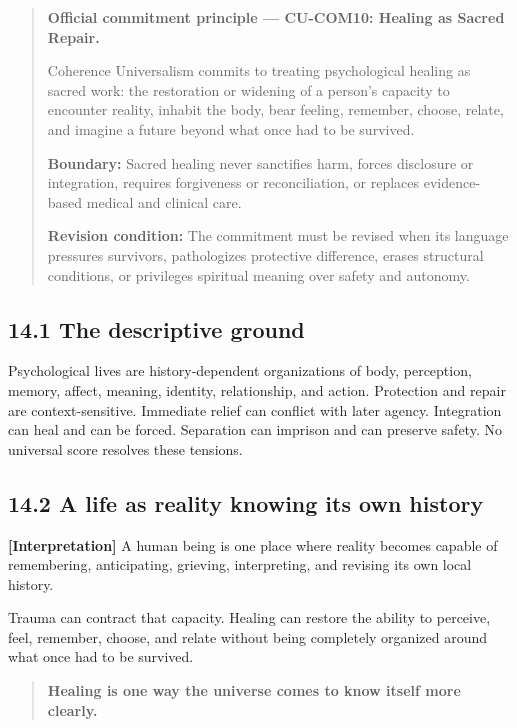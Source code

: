 \documentclass[
  11pt,
]{article}
\begin{document}
\begin{quote}
\textbf{Official commitment principle --- CU-COM10: Healing as Sacred
Repair.}

Coherence Universalism commits to treating psychological healing as
sacred work: the restoration or widening of a person's capacity to
encounter reality, inhabit the body, bear feeling, remember, choose,
relate, and imagine a future beyond what once had to be survived.

\textbf{Boundary:} Sacred healing never sanctifies harm, forces
disclosure or integration, requires forgiveness or reconciliation, or
replaces evidence-based medical and clinical care.

\textbf{Revision condition:} The commitment must be revised when its
language pressures survivors, pathologizes protective difference, erases
structural conditions, or privileges spiritual meaning over safety and
autonomy.
\end{quote}

\subsection{14.1 The descriptive ground}\label{the-descriptive-ground}

Psychological lives are history-dependent organizations of body,
perception, memory, affect, meaning, identity, relationship, and action.
Protection and repair are context-sensitive. Immediate relief can
conflict with later agency. Integration can heal and can be forced.
Separation can imprison and can preserve safety. No universal score
resolves these tensions.

\subsection{14.2 A life as reality knowing its own
history}\label{a-life-as-reality-knowing-its-own-history}

\textbf{{[}Interpretation{]}} A human being is one place where reality
becomes capable of remembering, anticipating, grieving, interpreting,
and revising its own local history.

Trauma can contract that capacity. Healing can restore the ability to
perceive, feel, remember, choose, and relate without being completely
organized around what once had to be survived.

\begin{quote}
\textbf{Healing is one way the universe comes to know itself more
clearly.}
\end{quote}
\end{document}
